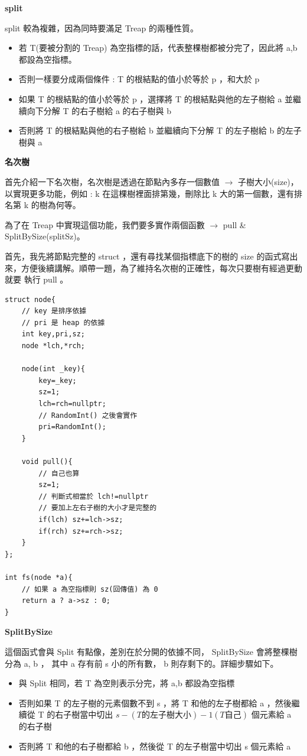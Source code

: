     \textbf{split}

    split 較為複雜，因為同時要滿足 Treap 的兩種性質。

    \begin{itemize}
        \item 若 T(要被分割的 Treap) 為空指標的話，代表整棵樹都被分完了，因此將 a,b 都設為空指標。
        \item 否則一樣要分成兩個條件 : T 的根結點的值小於等於 p ，和大於 p
        \item 如果 T 的根結點的值小於等於 p ，選擇將 T 的根結點與他的左子樹給 a 並繼續向下分解 T 的右子樹給 a 的右子樹與 b
        \item 否則將 T 的根結點與他的右子樹給 b 並繼續向下分解 T 的左子樹給 b 的左子樹與 a
    \end{itemize}

    \textbf{名次樹}

    首先介紹一下名次樹，名次樹是透過在節點內多存一個數值 $\to$ 子樹大小(size)，以實現更多功能，例如 : k 在這棵樹裡面排第幾，刪除比 k 大的第一個數，還有排名第 k 的樹為何等。

    為了在 Treap 中實現這個功能，我們要多實作兩個函數 $\to$ pull \& SplitBySize(splitSz)。

    首先，我先將節點完整的 struct ，還有尋找某個指標底下的樹的 size 的函式寫出來，方便後續講解。順帶一題，為了維持名次樹的正確性，每次只要樹有經過更動就要 執行 pull 。

\begin{lstlisting}[caption=node of Treap]
struct node{
    // key 是排序依據
    // pri 是 heap 的依據
    int key,pri,sz;
    node *lch,*rch;
    
    node(int _key){
        key=_key;
        sz=1;
        lch=rch=nullptr;
        // RandomInt() 之後會實作
        pri=RandomInt();
    }
    
    void pull(){
        // 自己也算
        sz=1;
        // 判斷式相當於 lch!=nullptr
        // 要加上左右子樹的大小才是完整的
        if(lch) sz+=lch->sz;
        if(rch) sz+=rch->sz;
    }
};

int fs(node *a){
    // 如果 a 為空指標則 sz(回傳值) 為 0
    return a ? a->sz : 0;
}
\end{lstlisting}

    \textbf{SplitBySize}

    這個函式會與 Split 有點像，差別在於分開的依據不同， SplitBySize 會將整棵樹分為 a, b ， 其中 a 存有前 s 小的所有數， b 則存剩下的。詳細步驟如下。

    \begin{itemize}
        \item 與 Split 相同，若 T 為空則表示分完，將 a,b 都設為空指標
        \item 否則如果 T 的左子樹的元素個數不到 s ，將 T 和他的左子樹都給 a ，然後繼續從 T 的右子樹當中切出 $s-( T 的左子樹大小)-1( T 自己)$ 個元素給 a 的右子樹
        \item 否則將 T 和他的右子樹都給 b ，然後從 T 的左子樹當中切出 s 個元素給 a
    \end{itemize}

